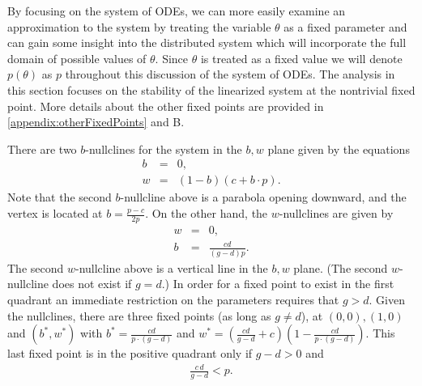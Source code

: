 \documentclass[review,authoryear]{elsarticle}
\begin{document}
By focusing on the system of ODEs, we can more easily examine an approximation to
the system by treating the variable $\theta$ as a fixed parameter and
can gain some insight into the distributed system which will incorporate the full domain of possible values of $\theta$. Since $\theta$ is treated as a fixed value we will denote $p(\theta)$ as $p$ throughout this discussion of the system of ODEs. The analysis in
this section focuses on the stability of the linearized system at the
nontrivial fixed point. More details about the other fixed points are
provided in  \ref{appendix:otherFixedPoints} and  B.

There are two $b$-nullclines for the system in the $b,w$ plane given by the equations
\begin{eqnarray}
  \label{eq:bnullclines}
  b & = & 0, \\
  w & = & (1-b)(c+b\cdot p).
\end{eqnarray}
Note that the second $b$-nullcline above is a parabola opening downward, and the vertex is located at
$b=\frac{p-c}{2p}$. On the other hand, the $w$-nullclines are given by
\begin{eqnarray}
  \label{eq:wnullclines}
  w & = & 0, \\
  b & = & \frac{cd}{(g-d)p}.
\end{eqnarray}
The second $w$-nullcline above is a vertical line in the $b,w$ plane. (The second $w$-nullcline does not exist if $g=d$.) In
order for a fixed point to exist in the first quadrant an immediate
restriction on the parameters requires that $g>d$.  Given the
nullclines, there are three fixed points (as long as $g\ne d$), at $(0,0), (1,0)$ and $(b^*,w^*)$ with $b^*=\frac{cd}{p\cdot (g-d)}$ and
$w^*=\left(\frac{cd}{g-d}+c\right)\left(1-\frac{cd}{p\cdot (g-d)}\right)$.  This last fixed point is in the positive quadrant only if $g-d>0$ and
\begin{eqnarray}
\label{eqn:positivityRequirement}
\frac{c\,d}{g-d}<p.
\end{eqnarray}
\end{document}
